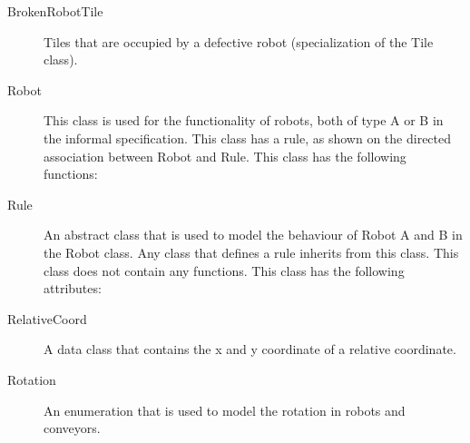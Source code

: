 \begin{description}
		\item[BrokenRobotTile] Tiles that are occupied by a defective robot (specialization of the Tile class).
		\item[Robot] This class is used for the functionality of robots, both of type A or B in the informal specification. This class has a rule, as shown on the directed association between Robot and Rule. This class has the following functions:
		\item[Rule] An abstract class that is used to model the behaviour of Robot A and B in the Robot class. Any class that defines a rule inherits from this class. This class does not contain any functions. This class has the following attributes:
		\item[RelativeCoord] A data class that contains the x and y coordinate of a relative coordinate.
		\item[Rotation] An enumeration that is used to model the rotation in robots and conveyors.
	\end{description}
